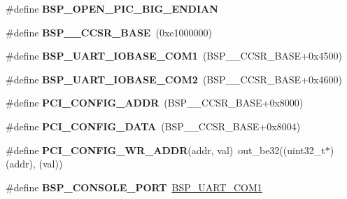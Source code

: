 \begin{DoxyCompactItemize}
\#define {\bfseries B\+S\+P\+\_\+\+O\+P\+E\+N\+\_\+\+P\+I\+C\+\_\+\+B\+I\+G\+\_\+\+E\+N\+D\+I\+AN}
\item 
\mbox{\label{group__RTEMSBSPsPowerPCMVME3100_ga71af70d3e9cd7e833c722f585e0da27c}} 
\#define {\bfseries B\+S\+P\+\_\+\_\+\+C\+C\+S\+R\+\_\+\+B\+A\+SE}~(0xe1000000)
\item 
\mbox{\label{group__RTEMSBSPsPowerPCMVME3100_gab259f83c40cdf929716d93a04b510006}} 
\#define {\bfseries B\+S\+P\+\_\+\+U\+A\+R\+T\+\_\+\+I\+O\+B\+A\+S\+E\+\_\+\+C\+O\+M1}~(B\+S\+P\+\_\+\_\+\+C\+C\+S\+R\+\_\+\+B\+A\+SE+0x4500)
\item 
\mbox{\label{group__RTEMSBSPsPowerPCMVME3100_ga2475131339f3941237ce2f311cdc4492}} 
\#define {\bfseries B\+S\+P\+\_\+\+U\+A\+R\+T\+\_\+\+I\+O\+B\+A\+S\+E\+\_\+\+C\+O\+M2}~(B\+S\+P\+\_\+\_\+\+C\+C\+S\+R\+\_\+\+B\+A\+SE+0x4600)
\item 
\mbox{\label{group__RTEMSBSPsPowerPCMVME3100_ga021c1fbdf175999fc707979d4674f5b9}} 
\#define {\bfseries P\+C\+I\+\_\+\+C\+O\+N\+F\+I\+G\+\_\+\+A\+D\+DR}~(B\+S\+P\+\_\+\_\+\+C\+C\+S\+R\+\_\+\+B\+A\+SE+0x8000)
\item 
\mbox{\label{group__RTEMSBSPsPowerPCMVME3100_gad1fedcf5fe37518ccc1ddfcb880d1b01}} 
\#define {\bfseries P\+C\+I\+\_\+\+C\+O\+N\+F\+I\+G\+\_\+\+D\+A\+TA}~(B\+S\+P\+\_\+\_\+\+C\+C\+S\+R\+\_\+\+B\+A\+SE+0x8004)
\item 
\mbox{\label{group__RTEMSBSPsPowerPCMVME3100_gafda846e492e75fe0980a7849d2e1deca}} 
\#define {\bfseries P\+C\+I\+\_\+\+C\+O\+N\+F\+I\+G\+\_\+\+W\+R\+\_\+\+A\+D\+DR}(addr,  val)~out\+\_\+be32((uint32\+\_\+t$\ast$)(addr), (val))
\item 
\mbox{\label{group__RTEMSBSPsPowerPCMVME3100_ga2c88f414089ddba7b640655bcbeffc96}} 
\#define {\bfseries B\+S\+P\+\_\+\+C\+O\+N\+S\+O\+L\+E\+\_\+\+P\+O\+RT}~\mbox{\hyperlink{group__i386__uart_gaa1561064cc8499388f7512347b434d25}{B\+S\+P\+\_\+\+U\+A\+R\+T\+\_\+\+C\+O\+M1}}
\item 
\mbox{\label{group__RTEMSBSPsPowerPCMVME3100_ga4b41bd0ec37c1f8b14ced54ab3a8a6f7}} 

\end{DoxyCompactItemize}
